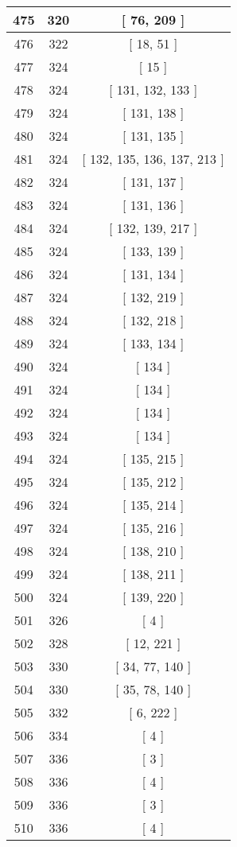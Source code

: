 \begin{center}
\begin{longtable}[H]{|| c c c ||}
475 & 320 & [ 76, 209 ]
\\\hline
476 & 322 & [ 18, 51 ]
\\\hline
477 & 324 & [ 15 ]
\\\hline
478 & 324 & [ 131, 132, 133 ]
\\\hline
479 & 324 & [ 131, 138 ]
\\\hline
480 & 324 & [ 131, 135 ]
\\\hline
481 & 324 & [ 132, 135, 136, 137, 213 ]
\\\hline
482 & 324 & [ 131, 137 ]
\\\hline
483 & 324 & [ 131, 136 ]
\\\hline
484 & 324 & [ 132, 139, 217 ]
\\\hline
485 & 324 & [ 133, 139 ]
\\\hline
486 & 324 & [ 131, 134 ]
\\\hline
487 & 324 & [ 132, 219 ]
\\\hline
488 & 324 & [ 132, 218 ]
\\\hline
489 & 324 & [ 133, 134 ]
\\\hline
490 & 324 & [ 134 ]
\\\hline
491 & 324 & [ 134 ]
\\\hline
492 & 324 & [ 134 ]
\\\hline
493 & 324 & [ 134 ]
\\\hline
494 & 324 & [ 135, 215 ]
\\\hline
495 & 324 & [ 135, 212 ]
\\\hline
496 & 324 & [ 135, 214 ]
\\\hline
497 & 324 & [ 135, 216 ]
\\\hline
498 & 324 & [ 138, 210 ]
\\\hline
499 & 324 & [ 138, 211 ]
\\\hline
500 & 324 & [ 139, 220 ]
\\\hline
501 & 326 & [ 4 ]
\\\hline
502 & 328 & [ 12, 221 ]
\\\hline
503 & 330 & [ 34, 77, 140 ]
\\\hline
504 & 330 & [ 35, 78, 140 ]
\\\hline
505 & 332 & [ 6, 222 ]
\\\hline
506 & 334 & [ 4 ]
\\\hline
507 & 336 & [ 3 ]
\\\hline
508 & 336 & [ 4 ]
\\\hline
509 & 336 & [ 3 ]
\\\hline
510 & 336 & [ 4 ]
\\\hline

\end{longtable}
\end{center}
